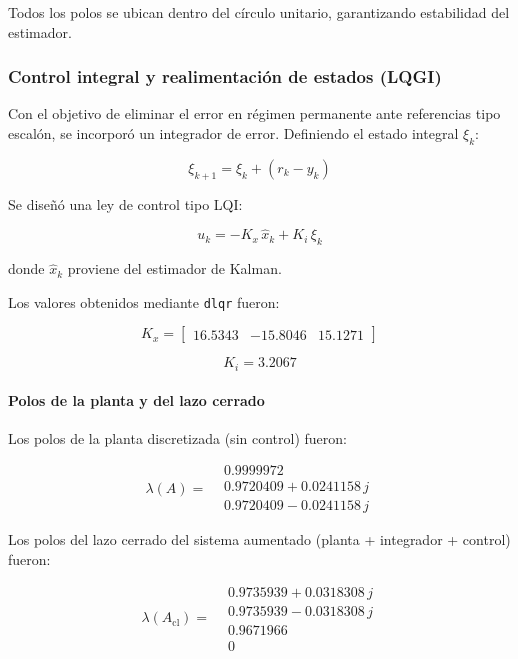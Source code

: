 Todos los polos se ubican dentro del círculo unitario,
garantizando estabilidad del estimador.

\subsubsection{Control integral y realimentación de estados (LQGI)}

Con el objetivo de eliminar el error en régimen permanente ante referencias tipo escalón,
se incorporó un integrador de error. Definiendo el estado integral \(\xi_k\):

\[
\xi_{k+1} = \xi_k + \left(r_k - y_k\right)
\]

Se diseñó una ley de control tipo LQI:

\[
u_k = -K_x\,\hat{x}_k + K_i\,\xi_k
\]

donde \(\hat{x}_k\) proviene del estimador de Kalman.

Los valores obtenidos mediante \texttt{dlqr} fueron:

\[
K_x =
\begin{bmatrix}
	16.5343 & -15.8046 & 15.1271
\end{bmatrix}
\]

\[
K_i = 3.2067
\]

\paragraph{Polos de la planta y del lazo cerrado}

Los polos de la planta discretizada (sin control) fueron:

\[
\lambda(A) =
\begin{aligned}
	&0.9999972 \\
	&0.9720409 + 0.0241158\,j \\
	&0.9720409 - 0.0241158\,j
\end{aligned}
\]

Los polos del lazo cerrado del sistema aumentado (planta + integrador + control) fueron:

\[
\lambda(A_{\text{cl}}) =
\begin{aligned}
	&0.9735939 + 0.0318308\,j \\
	&0.9735939 - 0.0318308\,j \\
	&0.9671966 \\
	&0
\end{aligned}
\]

